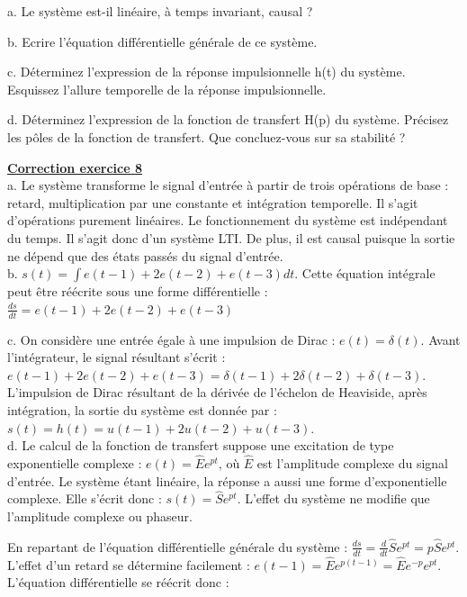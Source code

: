 \documentclass[11pt]{report}
\begin{document}
 	a. Le système est-il linéaire, à temps invariant, causal ?
 	
 	b. Ecrire l'équation différentielle générale de ce système.
 	
 	c. Déterminez l'expression de la réponse impulsionnelle h(t) du système. Esquissez l'allure temporelle de la réponse impulsionnelle. 
 	
 	d. Déterminez l'expression de la fonction de transfert H(p) du système. Précisez les pôles de la fonction de transfert. Que concluez-vous sur sa stabilité ?
 
 	\vspace{1\baselineskip}
 	
 		\textbf{\underline{Correction exercice 8}}\\
 	a. Le système transforme le signal d'entrée à partir de trois opérations de base : retard, multiplication par une constante et intégration temporelle. Il s'agit d'opérations purement linéaires. Le fonctionnement du système est indépendant du temps. Il s'agit donc d'un système LTI. De plus, il est causal puisque la sortie ne dépend que des états passés du signal d'entrée.\\
 	
 	b. $s(t)=\int e(t-1)+2e(t-2)+e(t-3) dt$. Cette équation intégrale peut être réécrite sous une forme différentielle : $\frac{ds}{dt}=e(t-1)+2e(t-2)+e(t-3)$ 
 	
 	c. On considère une entrée égale à une impulsion de Dirac : $e(t) = \delta(t)$.	Avant l'intégrateur, le signal résultant s'écrit : $e(t-1)+2e(t-2)+e(t-3)=\delta(t-1)+2\delta(t-2)+\delta(t-3)$. L'impulsion de Dirac résultant de la dérivée de l'échelon de Heaviside, après intégration, la sortie du système est donnée par : $s(t) = h(t) = u(t-1)+2u(t-2)+u(t-3)$.\\
 	
 	d. Le calcul de la fonction de transfert suppose une excitation de type exponentielle complexe : $e(t)=\hat{E}e^{pt}$, où $\hat{E}$ est l'amplitude complexe du signal d'entrée. Le système étant linéaire, la réponse a aussi une forme d'exponentielle complexe. Elle s'écrit donc : $s(t)=\hat{S}e^{pt}$. L'effet du système ne modifie que l'amplitude complexe ou phaseur.
 	
 	En repartant de l'équation différentielle générale du système : $\frac{ds}{dt}=\frac{d}{dt}\hat{S}e^{pt}=p\hat{S}e^{pt}$. L'effet d'un retard se détermine facilement : $e(t-1)=\hat{E}e^{p(t-1)}=\hat{E}e^{-p}e^{pt}$. L'équation différentielle se réécrit donc :
 	
\end{document}
